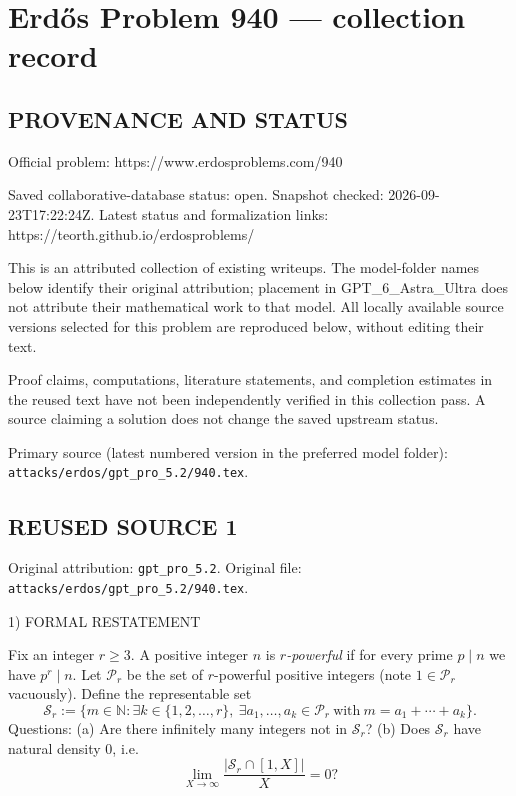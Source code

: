 \section*{Erd\H{o}s Problem 940 --- collection record}

\subsection*{PROVENANCE AND STATUS}
Official problem: https://www.erdosproblems.com/940

Saved collaborative-database status: open.
Snapshot checked: 2026-09-23T17:22:24Z.
Latest status and formalization links: https://teorth.github.io/erdosproblems/

This is an attributed collection of existing writeups. The model-folder names below identify their original attribution; placement in GPT\_6\_Astra\_Ultra does not attribute their mathematical work to that model. All locally available source versions selected for this problem are reproduced below, without editing their text.

Proof claims, computations, literature statements, and completion estimates in the reused text have not been independently verified in this collection pass. A source claiming a solution does not change the saved upstream status.

Primary source (latest numbered version in the preferred model folder): \texttt{attacks/erdos/gpt\_pro\_5.2/940.tex}.

\subsection*{REUSED SOURCE 1}
Original attribution: \texttt{gpt\_pro\_5.2}.
Original file: \texttt{attacks/erdos/gpt\_pro\_5.2/940.tex}.


1) FORMAL RESTATEMENT

Fix an integer \(r\ge 3\). A positive integer \(n\) is \emph{\(r\)-powerful} if for every prime \(p\mid n\) we have \(p^r\mid n\).
Let \(\mathcal P_r\) be the set of \(r\)-powerful positive integers (note \(1\in\mathcal P_r\) vacuously).
Define the representable set
\[\mathcal S_r := \Big\{m\in\mathbb N: \exists k\in\{1,2,\dots,r\},\ \exists a_1,\dots,a_k\in\mathcal P_r\ \text{with}\ m=a_1+\cdots+a_k\Big\}.
\]
Questions:
(a) Are there infinitely many integers not in \(\mathcal S_r\)?
(b) Does \(\mathcal S_r\) have natural density 0, i.e.
\[\lim_{X\to\infty} \frac{|\mathcal S_r\cap [1,X]|}{X}=0?\]

